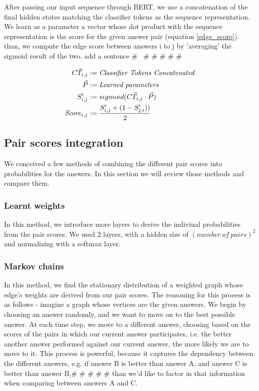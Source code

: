 \documentclass{article}
\begin{document}
After passing our input sequence through BERT, we use a concatenation of the final hidden states matching the classifier tokens as the sequence representation. We learn as a parameter a vector whose dot product with the sequence representation is the score for the given answer pair (equation \ref{edge_score}). than, we compute the edge score between answers i to j by 'averaging' the sigmoid result of the two. add a sentence \# \ \# \# \# \# \#


\begin{equation}
  \label{eq:t}
  \begin{aligned}
      \vec{CT_{i,j}} &:= \text{\textit{Classifier Tokens Concatenated}}\\ 
    \vec{P} &:= \text{\textit{Learned parameters}}\\
    S'_{i,j} &:= sigmoid(\vec{CT_{i,j}} \cdot \vec{P})\\
    \text{\textit{Score}}_{i,j} &:= \frac{S'_{i,j} + (1-S'_{j,i}))}{2}
  \end{aligned}
  \label{edge_score}
\end{equation}

\subsection{Pair scores integration}

We conceived a few methods of combining the different pair scores into probabilities for the answers. In this section we will review those methods and compare them.

\subsubsection{Learnt weights}

In this method, we introduce more layers to derive the indiviual probabilities from the pair scores. We used 2 layers, with a hidden size of $ (number\ of\ pairs)^2 $ and normalizing with a softmax layer.

\subsubsection{Markov chains}

In this method, we find the stationary distribution of a weighted graph whose edge's weights are derived from our pair scores.
The reasoning for this process is as follows - imagine a graph whose vertices are the given answers. We begin by choosing an answer randomly, and we want to move on to the best possible answer. At each time step, we move to a different answer, choosing based on the scores of the pairs in which our current answer participates, i.e. the better another answer performed against our current answer, the more likely we are to move to it.
This process is powerful, because it captures the dependency between the different answers, e.g. if answer B is better than answer A, and answer C is better than answer B,\# \# \# \# \#
than we'd like to factor in that information when comparing between answers A and C. 
\end{document}
